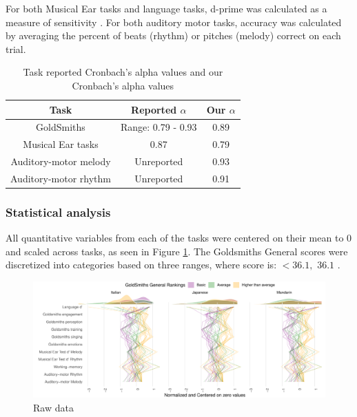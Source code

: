 \documentclass[a4paper]{article}
\begin{document}
For both Musical Ear tasks and language tasks, d-prime was calculated as a measure of sensitivity \cite{Macmillan_Creelman_2004}. For both auditory motor tasks, accuracy was calculated by averaging the percent of beats (rhythm) or pitches (melody) correct on each trial.


\setlength{\abovedisplayskip}{-10pt}
\setlength{\belowdisplayskip}{-10pt}
\setlength{\abovetopsep}{-10pt}
\setlength{\belowbottomsep}{-10pt}
\begin{table}[h]
\centering
\begin{tabular}{|c|c|c|}
\hline
\textbf{Task} & \textbf{Reported $\alpha$}& \textbf{Our $\alpha$} \\
\hline
GoldSmiths \cite{Müllensiefen_Gingras_Musil_Stewart_2014} & Range: 0.79 - 0.93 & 0.89 \\
Musical Ear tasks \cite{Wallentin_Nielsen_Friis-Olivarius_Vuust_Vuust_2010}& 0.87 & 0.79 \\
Auditory-motor melody \cite{Kachlicka_Saito_Tierney_2019}& Unreported & 0.93 \\
Auditory-motor rhythm\cite{Kachlicka_Saito_Tierney_2019}& Unreported & 0.91 \\
\hline
\end{tabular}
\caption{Task reported Cronbach's alpha values and our Cronbach's alpha values}
\label{tab:comparison}
\end{table}


\subsubsection{Statistical analysis}

All quantitative variables from each of the tasks were centered on their mean to 0 and scaled across tasks, as seen in Figure \ref{fig:centered_data}. The Goldsmiths General scores were discretized into categories based on three ranges, where score is:  $< 36.1,$ \quad {} \geq $ 36.1$ \quad {}  \cite{Müllensiefen_Gingras_Musil_Stewart_2014}. 

\begin{figure}[t]
  \centering
  \includegraphics[width=.9\textwidth]{SP_24_visuals/by_gs.pdf}
  \caption{Raw data}
  \label{fig:centered_data}
\end{figure}
\end{document}
